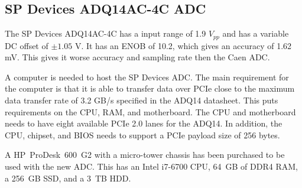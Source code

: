 \documentclass[../main/thesis.tex]{subfiles}
\begin{document}
\subsection{SP Devices ADQ14AC-4C ADC}
\label{e-adc-pc}

The SP Devices ADQ14AC-4C has a input range of 1.9 $V_{pp}$ and has a variable DC offset of $\pm1.05$ V. It has an \gls{ENOB} of 10.2, which gives an accuracy of 1.62 mV. This gives it worse accuracy and sampling rate then the Caen ADC. 

A computer is needed to host the SP Devices \gls{ADC}. The main requirement for the computer is that it is able to transfer data over \gls{PCIe} close to the maximum data transfer rate of 3.2 GB/s specified in the ADQ14 datasheet. This puts requirements on the CPU, RAM, and motherboard. The CPU and motherboard needs to have eight available \gls{PCIe} 2.0 lanes for the ADQ14. In addition, the CPU, chipset, and BIOS needs to support a \gls{PCIe} payload size of 256 bytes. %

A HP~ProDesk~600~G2 with a micro-tower chassis has been purchased to be used with the new ADC. This has an Intel i7-6700 CPU, 64~GB of DDR4 RAM, a 256~GB SSD, and a 3~TB HDD. 
\end{document}
